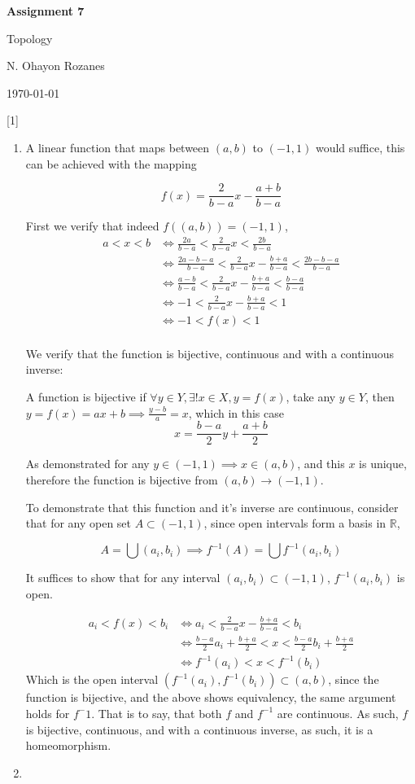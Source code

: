 \documentclass{article} %
\newcommand{\question}[2][]{
  \begin{flushleft}
    \textbf{Question #1}: \textit{#2}

\end{flushleft}}
\newcommand{\maketitletwo}[2][]{
  \begin{center}
    \Large{\textbf{Assignment #1}

    Topology} %
    \vspace{5pt}

    \normalsize{N. Ohayon Rozanes  %

    \today}        %
    \vspace{15pt}

\end{center}}
\begin{document}
\maketitletwo[7]  %

\question[1]{}
\begin{enumerate}
  \item
    A linear function that maps between $(a, b)$ to $(-1,1)$ would
    suffice, this can be achieved with the mapping

    \[
      f(x) = \frac{2}{b-a}x - \frac{a+b}{b-a}
    \]

    First we verify that indeed $f((a,b)) = (-1,1)$,
    \begin{align*}
      a < x < b &\iff \frac{2a}{b-a} < \frac{2}{b-a}x < \frac{2b}{b-a} \\
      &\iff \frac{2a - b - a}{b-a} < \frac{2}{b-a}x -
      \frac{b+a}{b-a}< \frac{2b
      - b - a}{b-a} \\
      &\iff \frac{a - b}{b-a} < \frac{2}{b-a}x - \frac{b+a}{b-a}<
      \frac{b-a}{b-a} \\
      &\iff -1 < \frac{2}{b-a}x - \frac{b+a}{b-a}<
      1 \\
      &\iff -1 < f(x)<
      1 \\
    \end{align*}

    We verify that the function is bijective, continuous and with a
    continuous inverse:

    A function is bijective if $\forall y \in Y, \exists!x \in X, y =
    f(x)$, take any $y \in Y$, then $y = f(x) = ax + b \implies
    \frac{y-b}{a} = x$, which in this case
    $$
    x = \frac{b-a}{2}y + \frac{a+b}{2}
    $$

    As demonstrated for any $y \in  (-1,1) \implies x\in(a,b)$, and this $x$ is
    unique, therefore the function is bijective from $(a,b) \to (-1,1)$.

    To demonstrate that this function and it's inverse are continuous,
    consider that for any open set $A \subset (-1,1)$, since open
    intervals form a basis in $\mathbb{R}$,

    \[
      A = \bigcup (a_i, b_i) \implies f^{-1}(A) = \bigcup f^{-1}(a_i, b_i)
    \]

    It suffices to show that for any interval $(a_i, b_i) \subset (-1,1)$,
    $f^{-1}(a_i, b_i)$ is open.

    \begin{align*}
      a_i < f(x) < b_i &\iff a_i < \frac{2}{b-a}x - \frac{b+a}{b-a} < b_i \\
      &\iff \frac{b-a}{2}a_i + \frac{b+a}{2} < x < \frac{b-a}{2}b_i +
      \frac{b+a}{2} \\
      &\iff f^{-1}(a_i) < x < f^{-1}(b_i)
    \end{align*}
    Which is the open interval $(f^{-1}(a_i), f^{-1}(b_i)) \subset
    (a,b)$, since the function is bijective, and the above shows
    equivalency, the same argument holds for $f^-1$. That is to say, that
    both $f$ and $f^{-1}$ are continuous. As such, $f$ is bijective,
    continuous, and with a continuous inverse, as such, it is a homeomorphism.
  \item


\end{enumerate}
\end{document}
